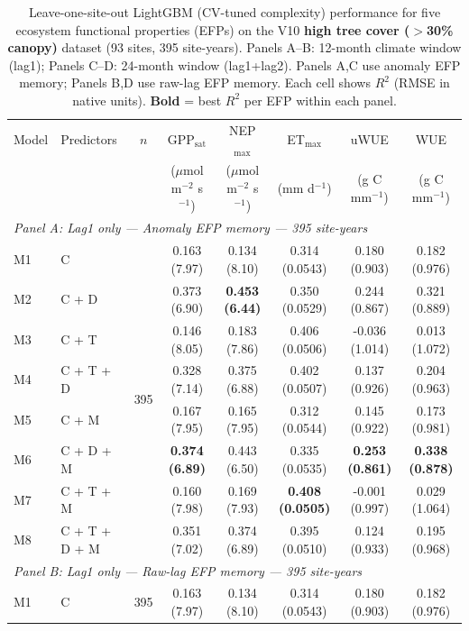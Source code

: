 \begin{table}[htbp]
\centering
\caption{Leave-one-site-out LightGBM (CV-tuned complexity) performance for five ecosystem functional properties (EFPs) on the V10 \textbf{high tree cover ($>$30\% canopy)} dataset (93 sites, 395 site-years). Panels A--B: 12-month climate window (lag1); Panels C--D: 24-month window (lag1+lag2). Panels A,C use anomaly EFP memory; Panels B,D use raw-lag EFP memory. Each cell shows $R^2$ (RMSE in native units). \textbf{Bold} = best $R^2$ per EFP within each panel.}
\label{tab:LGBtuned_LOSO_v10_filtered}
\footnotesize
\setlength{\tabcolsep}{4pt}
\begin{tabular}{llcccccc}
\toprule
Model & Predictors & $n$ & GPP$_\mathrm{sat}$ & NEP$_\mathrm{max}$ & ET$_\mathrm{max}$ & uWUE & WUE \\
  &  &  & ($\mu$mol m$^{-2}$ s$^{-1}$) & ($\mu$mol m$^{-2}$ s$^{-1}$) & (mm d$^{-1}$) & (g C mm$^{-1}$) & (g C mm$^{-1}$) \\
\midrule
\multicolumn{8}{l}{\textit{Panel A: Lag1 only --- Anomaly EFP memory --- 395 site-years}} \\
\midrule
M1 & C & \multirow{8}{*}{395} & 0.163 (7.97) & 0.134 (8.10) & 0.314 (0.0543) & 0.180 (0.903) & 0.182 (0.976) \\
M2 & C + D &  & 0.373 (6.90) & \textbf{0.453 (6.44)} & 0.350 (0.0529) & 0.244 (0.867) & 0.321 (0.889) \\
M3 & C + T &  & 0.146 (8.05) & 0.183 (7.86) & 0.406 (0.0506) & -0.036 (1.014) & 0.013 (1.072) \\
M4 & C + T + D &  & 0.328 (7.14) & 0.375 (6.88) & 0.402 (0.0507) & 0.137 (0.926) & 0.204 (0.963) \\
M5 & C + M &  & 0.167 (7.95) & 0.165 (7.95) & 0.312 (0.0544) & 0.145 (0.922) & 0.173 (0.981) \\
M6 & C + D + M &  & \textbf{0.374 (6.89)} & 0.443 (6.50) & 0.335 (0.0535) & \textbf{0.253 (0.861)} & \textbf{0.338 (0.878)} \\
M7 & C + T + M &  & 0.160 (7.98) & 0.169 (7.93) & \textbf{0.408 (0.0505)} & -0.001 (0.997) & 0.029 (1.064) \\
M8 & C + T + D + M &  & 0.351 (7.02) & 0.374 (6.89) & 0.395 (0.0510) & 0.124 (0.933) & 0.195 (0.968) \\
\midrule
\multicolumn{8}{l}{\textit{Panel B: Lag1 only --- Raw-lag EFP memory --- 395 site-years}} \\
\midrule
M1 & C & \multirow{8}{*}{395} & 0.163 (7.97) & 0.134 (8.10) & 0.314 (0.0543) & 0.180 (0.903) & 0.182 (0.976) \\

\end{tabular}
\end{table}
